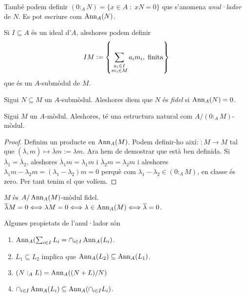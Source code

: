 \documentclass[../../../main.tex]{subfiles}
\begin{document}
\begin{defi}
\label{def:anuladorModuls}També podem definir $(0:_AN) = \{x\in A\;:\;xN = 0\}$ que s'anomena \textit{anul·lador} de $N$. Es pot escriure com $\operatorname{Ann}_A(N)$.
\end{defi}

Si $I\subseteq A$ és un ideal d'$A$, aleshores podem definir
\begin{equation}
    \notag
    IM:=\left\{\sum_{\substack{a_i\in I\\m_i\in M}}a_im_i,\;\text{finita}\right\}
\end{equation}
que és un $A$-submòdul de $M$. 

\begin{defi}
[Fidel]\label{def:fidel} Sigui $N\subseteq M$ un $A$-submòdul. Aleshores diem que $N$ és \textit{fidel} si $\operatorname{Ann}_A(N) = 0$.
\end{defi}

\begin{prop}
\label{prop:anulador} Sigui $M$ un $A$-mòdul. Aleshores, té una estructura natural com $A/(0:_AM)$-mòdul.
\end{prop}
\begin{proof}
Definim un producte en $\operatorname{Ann}_A(M)$. Podem definir-ho així: $\dot:M\to M$ tal que $(\overline{\lambda},m)\mapsto\overline{\lambda}m:=\lambda m$. Ara hem de demostrar que està ben definida. Si $\overline{\lambda}_1 = \overline{\lambda}_2$, aleshores $\overline{\lambda}_1m = \lambda_1m$ i $\overline{\lambda}_2m = \lambda_2m$ i aleshores $\lambda_1m-\lambda_2m = (\lambda_1-\lambda_2)m = 0$ perquè com $\lambda_1-\lambda_2\in (0:_AM)$, en classe és zero. Per tant tenim el que volíem.
\end{proof}

\begin{nota}
$M$ és $A/\operatorname{Ann}_A(M)$-mòdul fidel. $\overline{\lambda}M = 0 \Longleftrightarrow \lambda M = 0\Longleftrightarrow \lambda\in \operatorname{Ann}_A(M)\Longleftrightarrow \overline{\lambda} = 0$.
\end{nota}

\begin{prop}
\label{prop:propietatsAnuladorModul} Algunes propietats de l'anul·lador són
\begin{enumerate}[(1)]
    \item $\operatorname{Ann}_A(\sum_{i\in I}L_i = \cap_{i\in I}\operatorname{Ann}_A(L_i)$.
    \item $L_1\subseteq L_2$ implica que $\operatorname{Ann}_A(L_2)\subseteq \operatorname{Ann}_A(L_1)$.
    \item $(N:_AL) = \operatorname{Ann}_A((N+L)/N)$
    \item $\cap_{i\in I}\operatorname{Ann}_A(L_i)\subseteq \operatorname{Ann}_A(\cap_{i\in I}L_i)$.
\end{enumerate}
\end{prop}
\end{document}
